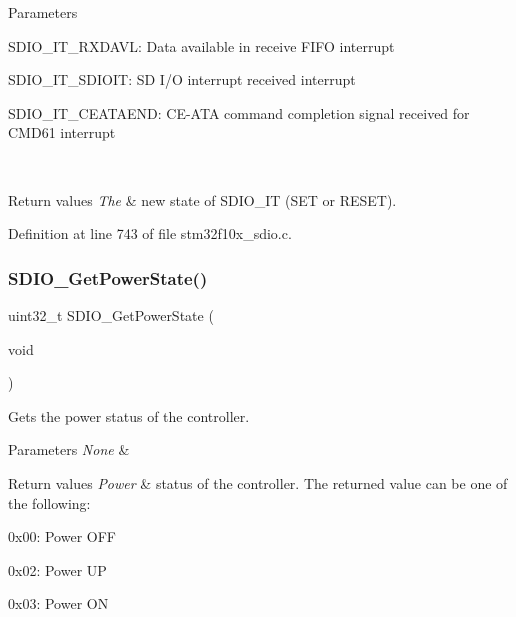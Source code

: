 \begin{DoxyParams}{Parameters}
\begin{DoxyItemize}
S\+D\+I\+O\+\_\+\+I\+T\+\_\+\+R\+X\+D\+A\+VL\+: Data available in receive F\+I\+FO interrupt \item S\+D\+I\+O\+\_\+\+I\+T\+\_\+\+S\+D\+I\+O\+IT\+: SD I/O interrupt received interrupt \item S\+D\+I\+O\+\_\+\+I\+T\+\_\+\+C\+E\+A\+T\+A\+E\+ND\+: C\+E-\/\+A\+TA command completion signal received for C\+M\+D61 interrupt \end{DoxyItemize}
\\
\hline
\end{DoxyParams}

\begin{DoxyRetVals}{Return values}
{\em The} & new state of S\+D\+I\+O\+\_\+\+IT (S\+ET or R\+E\+S\+ET). \\
\hline
\end{DoxyRetVals}


Definition at line 743 of file stm32f10x\+\_\+sdio.\+c.

\mbox{\label{group___s_d_i_o___private___functions_ga3a19de2c7cd51645702213f64a1758ed}} 
\subsubsection{\texorpdfstring{S\+D\+I\+O\+\_\+\+Get\+Power\+State()}{SDIO\_GetPowerState()}}
{\footnotesize\ttfamily uint32\+\_\+t S\+D\+I\+O\+\_\+\+Get\+Power\+State (\begin{DoxyParamCaption}\item[{void}]{ }\end{DoxyParamCaption})}



Gets the power status of the controller. 


\begin{DoxyParams}{Parameters}
{\em None} & \\
\hline
\end{DoxyParams}

\begin{DoxyRetVals}{Return values}
{\em Power} & status of the controller. The returned value can be one of the following\+:
\begin{DoxyItemize}
\item 0x00\+: Power O\+FF
\item 0x02\+: Power UP
\item 0x03\+: Power ON 
\end{DoxyItemize}\\
\hline
\end{DoxyRetVals}


